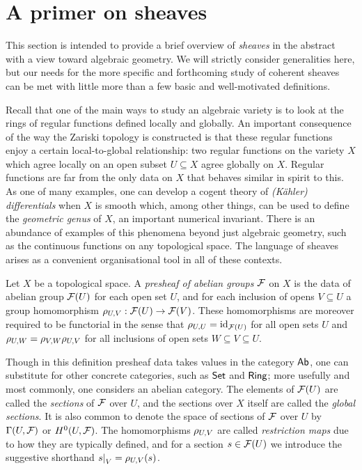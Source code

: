 \section{A primer on sheaves}
\label{sect_sheaf_primer}

This section is intended to provide a brief overview of
\emph{sheaves} in the abstract with a view toward algebraic geometry.
We will strictly consider generalities here, but our needs for the
more specific and forthcoming study of coherent sheaves can be met
with little more than a few basic and well-motivated definitions.

Recall that one of the main ways to study an algebraic variety is to
look at the rings of regular functions defined locally and globally.
An important consequence of the way the Zariski topology is
constructed is that these regular functions enjoy a certain
local-to-global relationship: two regular functions on the variety
$X$ which agree locally on an open subset $U \subseteq X$ agree globally on $X$.
Regular functions are far from the only data on $X$ that behaves
similar in spirit to this.
As one of many examples, one can develop a cogent theory of
\emph{(K\"{a}hler) differentials} when $X$ is smooth which, among
other things, can be used to define the \emph{geometric genus} of
$X$, an important numerical invariant.
There is an abundance of examples of this phenomena beyond just
algebraic geometry, such as the continuous functions on any topological space.
The language of sheaves arises as a convenient organisational tool in
all of these contexts.

\begin{definition}
  \label{def_presheaf}
  Let $X$ be a topological space.
  A \emph{presheaf of abelian groups} $\mathcal{F}$ on $X$ is the data of
  abelian group $\mathcal{F}(U)$ for each open set $U$, and for each
  inclusion of opens $V \subseteq U$ a group homomorphism
  $\rho_{{U}, {V}}: \mathcal{F}(U) \to \mathcal{F}(V)$.
  These homomorphisms are moreover required to be functorial in the
  sense that $\rho_{{U}, {U}} = \operatorname{id}_{\mathcal{F}(U)}$ for all open sets $U$
  and $\rho_{{U}, {W}} = \rho_{{V}, {W}} \rho_{{U}, {V}}$ for all inclusions of open
  sets $W \subseteq V \subseteq U$.
\end{definition}

Though in this definition presheaf data takes values in the category
$\mathsf{Ab}$, one can substitute for other concrete categories, such as
$\mathsf{Set}$ and $\mathsf{Ring}$; more usefully and most commonly, one considers an
abelian category.
The elements of $\mathcal{F}(U)$ are called the \emph{sections} of
$\mathcal{F}$ over $U$, and the sections over $X$ itself are called the
\emph{global sections}.
It is also common to denote the space of sections of $\mathcal{F}$ over
$U$ by $\Gamma({U}, {\mathcal{F}})$ or $H^0(U, \mathcal{F})$.
The homomorphisms $\rho_{{U}, {V}}$ are called \emph{restriction maps} due
to how they are typically defined, and for a section $s \in
\mathcal{F}(U)$ we introduce the suggestive shorthand $\setres{s}{V} =
\res{U}{V}(s)$.


